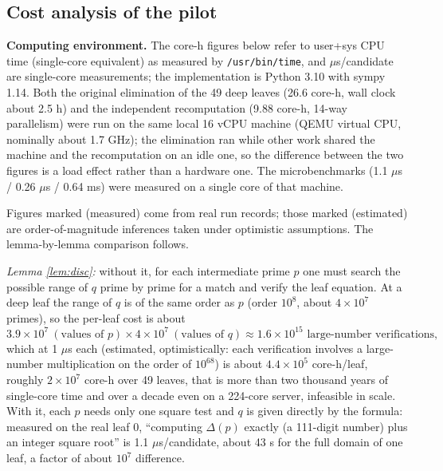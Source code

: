 \documentclass[11pt]{article}
\theoremstyle{remark}
\begin{document}
\subsection{Cost analysis of the pilot}\label{sec:cost}

\textbf{Computing environment.} The core-h figures below refer to user+sys CPU time (single-core equivalent) as measured by \texttt{/usr/bin/time}, and $\mu$s/candidate are single-core measurements; the implementation is Python 3.10 with sympy 1.14. Both the original elimination of the 49 deep leaves (26.6 core-h, wall clock about 2.5 h) and the independent recomputation (9.88 core-h, 14-way parallelism) were run on the same local 16 vCPU machine (QEMU virtual CPU, nominally about 1.7 GHz); the elimination ran while other work shared the machine and the recomputation on an idle one, so the difference between the two figures is a load effect rather than a hardware one. The microbenchmarks (1.1 $\mu$s / 0.26 $\mu$s / 0.64 ms) were measured on a single core of that machine.

Figures marked (measured) come from real run records; those marked (estimated) are order-of-magnitude inferences taken under optimistic assumptions. The lemma-by-lemma comparison follows.

\emph{Lemma \ref{lem:disc}:} without it, for each intermediate prime $p$ one must search the possible range of $q$ prime by prime for a match and verify the leaf equation. At a deep leaf the range of $q$ is of the same order as $p$ (order $10^8$, about $4 \times 10^7$ primes), so the per-leaf cost is about
\[ 3.9 \times 10^7 \ (\text{values of } p) \times 4 \times 10^7 \ (\text{values of } q) \approx 1.6 \times 10^{15} \text{ large-number verifications},
\] which at 1 $\mu$s each (estimated, optimistically: each verification involves a large-number multiplication on the order of $10^{68}$) is about $4.4 \times 10^5$ core-h/leaf, roughly $2 \times 10^7$ core-h over 49 leaves, that is more than two thousand years of single-core time and over a decade even on a 224-core server, infeasible in scale. With it, each $p$ needs only one square test and $q$ is given directly by the formula: measured on the real leaf 0, ``computing $\Delta(p)$ exactly (a 111-digit number) plus an integer square root'' is 1.1 $\mu$s/candidate, about 43 s for the full domain of one leaf, a factor of about $10^7$ difference.
\end{document}
